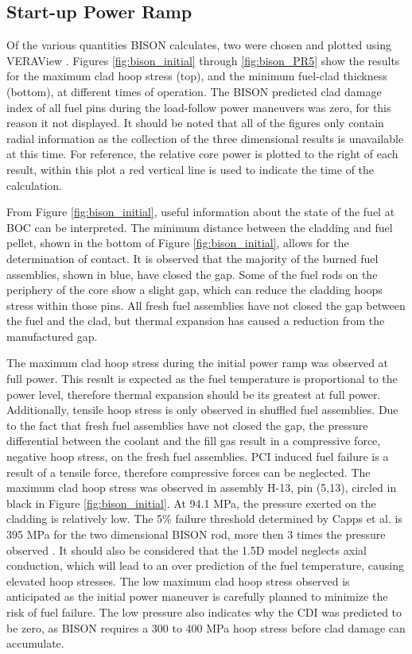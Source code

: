\documentclass[edeposit,fullpage,11pt]{uiucthesis2009}
\begin{document}
\subsection{Start-up Power Ramp}

Of the various quantities BISON calculates, two were chosen and plotted using VERAView \cite{lee_veraview_2016}.
Figures \ref{fig:bison_initial} through \ref{fig:bison_PR5} show the results for the maximum clad hoop stress (top), and the minimum fuel-clad thickness (bottom), at different times of operation. 
The BISON predicted clad damage index of all fuel pins during the load-follow power maneuvers was zero, for this reason it not displayed.
It should be noted that all of the figures only contain radial information as the collection of the three dimensional results is unavailable at this time. 
For reference, the relative core power is plotted to the right of each result, within this plot a red vertical line is used to indicate the time of the calculation.

From Figure \ref{fig:bison_initial}, useful information about the state of the fuel at \gls{BOC}  can be interpreted. 
The minimum distance between the cladding and fuel pellet, shown in the bottom of Figure \ref{fig:bison_initial}, allows for the determination of contact. 
It is observed that the majority of the burned fuel assemblies, shown in blue, have closed the gap. 
Some of the fuel rods on the periphery of the core show a slight gap, which can reduce the cladding hoops stress within those pins.
All fresh fuel assemblies have not closed the gap between the fuel and the clad, but thermal expansion has caused a reduction from the manufactured gap.

The maximum clad hoop stress during the initial power ramp was observed at full power.
This result is expected as the fuel temperature is proportional to the power level, therefore thermal expansion should be its greatest at full power.
Additionally, tensile hoop stress is only observed in shuffled fuel assemblies.
Due to the fact that fresh fuel assemblies have not closed the gap, the pressure differential between the coolant and the fill gas result in a compressive force, negative hoop stress, on the fresh fuel assemblies.
\gls{PCI} induced fuel failure is a result of a tensile force, therefore compressive forces can be neglected.
The maximum clad hoop stress was observed in assembly H-13, pin (5,13), circled in black in Figure \ref{fig:bison_initial}. 
At 94.1 MPa, the pressure exerted on the cladding is relatively low. 
The 5\% failure threshold determined by Capps et al. is 395 MPa for the two dimensional BISON rod, more then 3 times the pressure observed \cite{capps_pci_2017}.
It should also be considered that the 1.5D model neglects axial conduction, which will lead to an over prediction of the fuel temperature, causing elevated hoop stresses.
The low maximum clad hoop stress observed is anticipated as the initial power maneuver is carefully planned to minimize the risk of fuel failure.
The low pressure also indicates why the CDI was predicted to be zero, as BISON requires a 300 to 400 MPa hoop stress before clad damage can accumulate.
\end{document}
